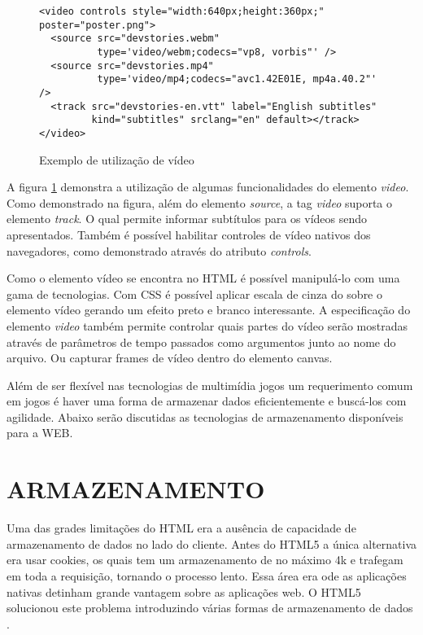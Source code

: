 \begin{figure}[H]
\centering
\begin{verbatim}
<video controls style="width:640px;height:360px;" poster="poster.png">
  <source src="devstories.webm" 
          type='video/webm;codecs="vp8, vorbis"' />
  <source src="devstories.mp4" 
          type='video/mp4;codecs="avc1.42E01E, mp4a.40.2"' />
  <track src="devstories-en.vtt" label="English subtitles" 
         kind="subtitles" srclang="en" default></track>
</video>
\end{verbatim}
\caption{Exemplo de utilização de vídeo}
\label{fig:video}
\end{figure}

A figura \ref{fig:video} demonstra a utilização de algumas
funcionalidades do elemento \textit{video}. Como demonstrado na figura,
além do elemento \textit{source}, a tag \textit{video} suporta o
elemento \textit{track}. O qual permite informar subtítulos para os
vídeos sendo apresentados. Também é possível habilitar controles de
vídeo nativos dos navegadores, como demonstrado através do atributo
\textit{controls}.

Como o elemento vídeo se encontra no HTML é possível manipulá-lo com
uma gama de tecnologias. Com CSS é possível aplicar escala de cinza do
sobre o elemento vídeo gerando um efeito preto e branco interessante.
A especificação do elemento \textit{video} também permite controlar
quais partes do vídeo serão mostradas através de parâmetros de tempo
passados como argumentos junto ao nome do arquivo. Ou capturar 
frames de vídeo dentro do elemento canvas.

Além de ser flexível nas tecnologias de multimídia jogos um
requerimento comum em jogos é haver uma forma de armazenar dados
eficientemente e buscá-los com agilidade. Abaixo serão discutidas as
tecnologias de armazenamento disponíveis para a WEB.
\section{ARMAZENAMENTO}
Uma das grades limitações do HTML era a ausência de capacidade de
armazenamento de dados no lado do cliente. Antes do HTML5 a única
alternativa era usar cookies, os quais tem um armazenamento de no
máximo 4k e trafegam em toda a requisição, tornando o processo lento.
Essa área era ode as aplicações nativas detinham grande vantagem
sobre as aplicações web. O HTML5 solucionou este problema introduzindo
várias formas de armazenamento de dados \autocite{html5Tradeoffs}.


